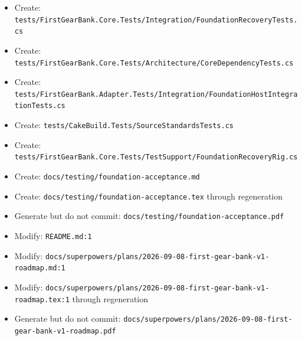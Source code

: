 \documentclass[
  10pt,
  letterpaper,
]{article}
\newcommand{\passthrough}[1]{#1}
\providecommand{\tightlist}{%
  \setlength{\itemsep}{0pt}\setlength{\parskip}{0pt}}
\begin{document}
\begin{itemize}
\tightlist
\item
  Create:
  \texttt{tests/}\allowbreak{}\texttt{FirstGearBank.}\allowbreak{}\texttt{Core.}\allowbreak{}\texttt{Tests/}\allowbreak{}\texttt{Integration/}\allowbreak{}\texttt{FoundationRecoveryTests.}\allowbreak{}\texttt{cs}
\item
  Create:
  \texttt{tests/}\allowbreak{}\texttt{FirstGearBank.}\allowbreak{}\texttt{Core.}\allowbreak{}\texttt{Tests/}\allowbreak{}\texttt{Architecture/}\allowbreak{}\texttt{CoreDependencyTests.}\allowbreak{}\texttt{cs}
\item
  Create:
  \texttt{tests/}\allowbreak{}\texttt{FirstGearBank.}\allowbreak{}\texttt{Adapter.}\allowbreak{}\texttt{Tests/}\allowbreak{}\texttt{Integration/}\allowbreak{}\texttt{FoundationHostIntegrationTests.}\allowbreak{}\texttt{cs}
\item
  Create:
  \texttt{tests/}\allowbreak{}\texttt{CakeBuild.}\allowbreak{}\texttt{Tests/}\allowbreak{}\texttt{SourceStandardsTests.}\allowbreak{}\texttt{cs}
\item
  Create:
  \texttt{tests/}\allowbreak{}\texttt{FirstGearBank.}\allowbreak{}\texttt{Core.}\allowbreak{}\texttt{Tests/}\allowbreak{}\texttt{TestSupport/}\allowbreak{}\texttt{FoundationRecoveryRig.}\allowbreak{}\texttt{cs}
\item
  Create:
  \texttt{docs/}\allowbreak{}\texttt{testing/}\allowbreak{}\texttt{foundation-}\allowbreak{}\texttt{acceptance.}\allowbreak{}\texttt{md}
\item
  Create:
  \texttt{docs/}\allowbreak{}\texttt{testing/}\allowbreak{}\texttt{foundation-}\allowbreak{}\texttt{acceptance.}\allowbreak{}\texttt{tex}
  through regeneration
\item
  Generate but do not commit:
  \texttt{docs/}\allowbreak{}\texttt{testing/}\allowbreak{}\texttt{foundation-}\allowbreak{}\texttt{acceptance.}\allowbreak{}\texttt{pdf}
\item
  Modify: \passthrough{\lstinline!README.md:1!}
\item
  Modify:
  \texttt{docs/}\allowbreak{}\texttt{superpowers/}\allowbreak{}\texttt{plans/}\allowbreak{}\texttt{2026-}\allowbreak{}\texttt{09-}\allowbreak{}\texttt{08-}\allowbreak{}\texttt{first-}\allowbreak{}\texttt{gear-}\allowbreak{}\texttt{bank-}\allowbreak{}\texttt{v1-}\allowbreak{}\texttt{roadmap.}\allowbreak{}\texttt{md:}\allowbreak{}\texttt{1}
\item
  Modify:
  \texttt{docs/}\allowbreak{}\texttt{superpowers/}\allowbreak{}\texttt{plans/}\allowbreak{}\texttt{2026-}\allowbreak{}\texttt{09-}\allowbreak{}\texttt{08-}\allowbreak{}\texttt{first-}\allowbreak{}\texttt{gear-}\allowbreak{}\texttt{bank-}\allowbreak{}\texttt{v1-}\allowbreak{}\texttt{roadmap.}\allowbreak{}\texttt{tex:}\allowbreak{}\texttt{1}
  through regeneration
\item
  Generate but do not commit:
  \texttt{docs/}\allowbreak{}\texttt{superpowers/}\allowbreak{}\texttt{plans/}\allowbreak{}\texttt{2026-}\allowbreak{}\texttt{09-}\allowbreak{}\texttt{08-}\allowbreak{}\texttt{first-}\allowbreak{}\texttt{gear-}\allowbreak{}\texttt{bank-}\allowbreak{}\texttt{v1-}\allowbreak{}\texttt{roadmap.}\allowbreak{}\texttt{pdf}
\end{itemize}
\end{document}

